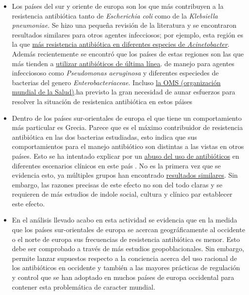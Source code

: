 \documentclass[
]{article}
\begin{document}
\begin{itemize}
\item
  Los países del sur y oriente de europa son los que más contribuyen a
  la resistencia antibiótica tanto de \emph{Escherichia coli} como de la
  \emph{Klebsiella pneumoniae}. Se hizo una pequeña revisión de la
  literatura y se encontraron resultados similares para otros agentes
  infecciosos; por ejemplo, esta región es la que
  \href{https://www.cidrap.umn.edu/news-perspective/2017/11/latest-european-data-show-increasing-antibiotic-resistance}{más
  resistencia antibiótica en diferentes especies de
  \emph{Acinetobacter}}. Además recientemente se encontró que los países
  de estas regiones son las que más tienden a
  \href{https://aricjournal.biomedcentral.com/track/pdf/10.1186/s13756-019-0662-8}{utilizar
  antibióticos de última línea}. de manejo para agentes infecciososo
  como \emph{Pseudomonas aeruginosa} y diferentes especiedes de
  bacterias del genero \emph{Enterobacteriaceae}. Incluso
  \href{https://www.euro.who.int/en/health-topics/disease-prevention/antimicrobial-resistance/news/news/2019/7/survey-in-eastern-european-and-central-asian-countries-finds-further-control-of-antibiotics-use-needed}{la
  OMS (organización mundial de la Salud)}.ha previsto la gran necesidad
  de aunar esfuerzos para resolver la situación de resistenica
  antibiótica en estos páises
\item
  Dentro de los países sur-orientales de europa el que tiene un
  comportamiento más particular es Grecia. Parece que es el máximo
  contribuidor de resistencia antibiótica en las dos bacterias
  estudiadas, esto indica que sus comportamientos para el manejo
  antibiótico son distintas a las vistas en otros países. Esto se ha
  intentado explicar por un
  \href{https://www.bmj.com/content/355/bmj.i6328/rr-0}{abuso del uso de
  antibióticos} en diferentes escenarios clínicos en este país . No es
  la primera vez que se evidencia esto, ya múltiples grupos han
  encontrado
  \href{http://resistancecontrol.info/2016/government-engagement/national-strategies-for-the-control-of-antimicrobial-resistance-the-hellenic-challenge/}{resultados
  similares}. Sin embargo, las razones precisas de este efecto no son
  del todo claras y se requieren de más estudios de indole social,
  cultura y clínico par establecer este efecto.
\item
  En el análisis llevado acabo en esta actividad se evidencia que en la
  medida que los países sur-orientales de europa se acercan
  geográficamente al occidente o el norte de europa sus frecuencias de
  resistencia antibiótica es menor. Esto debe ser comprobado a través de
  más estudios geopoblacionales. Sin embargo, permite lanzar supuestos
  respecto a la conciencia acerca del uso racional de los antibióticos
  en occidente y también a las mayores prácticas de regulación y control
  que se han adoptado en muchos países de europa occidental para
  contener esta problemática de caracter mundial.
\end{itemize}
\end{document}
